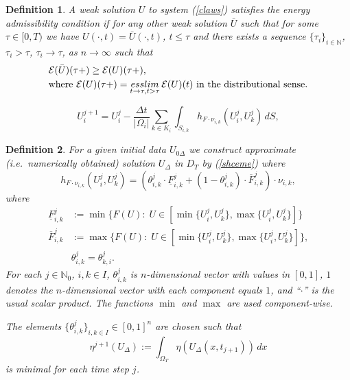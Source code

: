 \documentclass[10pt,a4paper]{amsart}
\newtheorem{definition}{Definition}
\begin{document}
\begin{definition} \label{def-dafermos}
A weak solution $U$ to system (\ref{claws}) satisfies the energy
admissibility condition if for any other weak solution
$\bar{U}$ such that for some $\tau\in [0,T)$ we have
$U(\cdot,t)=\bar{U}(\cdot,t)$, $t\leq \tau$ and 
there exists a sequence $\{\tau_{i} \}_{i \in \mathbb{N}}$, $\tau_{i}>\tau$,
$\tau_{i}\to \tau$, as $n\to \infty$ such that
\[
\begin{split}
& \mathcal{E}(\bar{U})(\tau +)\geq \mathcal{E}(U)(\tau +), \\ 
& \text{where }
\mathcal{E}(U)(\tau +)=\mathop{\rm esslim}_{t \to \tau, t>\tau}\mathcal{E}(U)(t)
\text{ in the distributional sense}.
\end{split}
\]
\end{definition}

\begin{equation} \label{shceme}
U_{i}^{j+1}=U_{i}^{j}-\dfrac{\Delta t}{|\Omega _{i}| }
\sum_{k\in K_{i}}\int_{S_{i,k}}h_{F\cdot \nu_{i,k}}(U_{i}^{j},U_{k}^{j})\, dS,
\end{equation}

\begin{definition} \label{defscheme}
For a given initial data $U_{0\Delta}$ we construct approximate 
(i.e.\ numerically obtained) solution 
$U_{\Delta}$ in $D_{T}$ by (\ref{shceme}) where
\begin{equation} \label{nflux}
h_{F\cdot \nu_{i,k}}(U_{i}^{j},U_{k}^{j})
=(\theta_{i,k}^{j} \cdot \underline{F}_{i,k}^{j}+(1-\theta_{i,k}^{j})\cdot
\overline{F}_{i,k}^{j})\cdot \nu_{i,k}, 
\end{equation}
where 
\[
\begin{split}
\underline{F}_{i,k}^{j}&:=\min\{F(U):\; U\in [\min\{ U_{i}^{j},
U_{k}^{j}\},\max\{U_{i}^{j}, U_{k}^{j}\}]\}\\
\overline{F}_{i,k}^{j}&:=\max\{F(U):\; U\in [\min\{ U_{i}^{j},
U_{k}^{j}\},\max\{U_{i}^{j}, U_{k}^{j}\}]\},
\\ & \theta_{i,k}^{j}=\theta_{k,i}^{j}.
\end{split}
\] 	
For each $j\in \mathbb{N}_{0}$, $i,k\in I$, 
$\theta_{i,k}^{j}$ is $n$-dimensional vector with values in $[0,1]$, 
$1$ denotes the $n$-dimensional vector with each component equals $1$, 
and ``$\cdot$'' is the usual scalar product. 
The functions $\min$ and $\max$ are used component-wise.
	
The elements $\{\theta_{i,k}^{j}\}_{i,k\in I}\in [0,1]^{n}$ are chosen such that 
\[\eta^{j+1}(U_{\Delta}):=\int_{\Omega_{T}}\eta(U_{\Delta}(x,t_{j+1}))\,dx\] 
is minimal for each time step $j$.
\end{definition}
\end{document}

